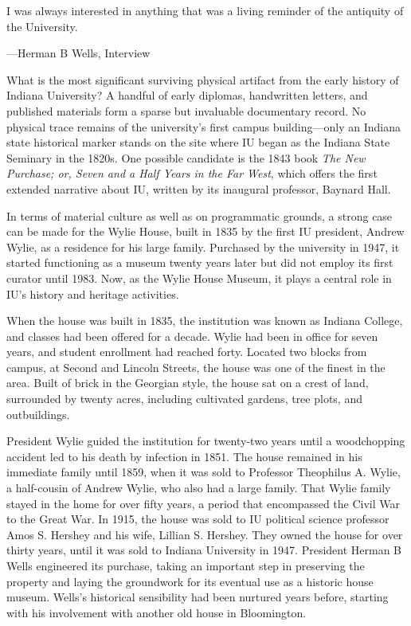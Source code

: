 \documentclass[
  american,
  letterpaper,
]{scrreprt}
\begin{document}
\epigraph{
I was always interested in anything that was a living reminder of the antiquity of the University.  
}
{---Herman B Wells, Interview}

What is the most significant surviving physical artifact from the early
history of Indiana University? A handful of early diplomas, handwritten
letters, and published materials form a sparse but invaluable
documentary record. No physical trace remains of the university's first
campus building---only an Indiana state historical marker stands on the
site where IU began as the Indiana State Seminary in the 1820s. One
possible candidate is the 1843 book \emph{The New Purchase; or, Seven
and a Half Years in the Far West}, which offers the first extended
narrative about IU, written by its inaugural professor, Baynard Hall.

In terms of material culture as well as on programmatic grounds, a
strong case can be made for the Wylie House, built in 1835 by the first
IU president, Andrew Wylie, as a residence for his large family.
Purchased by the university in 1947, it started functioning as a museum
twenty years later but did not employ its first curator until 1983. Now,
as the Wylie House Museum, it plays a central role in IU's history and
heritage activities.

When the house was built in 1835, the institution was known as Indiana
College, and classes had been offered for a decade. Wylie had been in
office for seven years, and student enrollment had reached forty.
Located two blocks from campus, at Second and Lincoln Streets, the house
was one of the finest in the area. Built of brick in the Georgian style,
the house sat on a crest of land, surrounded by twenty acres, including
cultivated gardens, tree plots, and outbuildings.

President Wylie guided the institution for twenty-two years until a
woodchopping accident led to his death by infection in 1851. The house
remained in his immediate family until 1859, when it was sold to
Professor Theophilus A. Wylie, a half-cousin of Andrew Wylie, who also
had a large family. That Wylie family stayed in the home for over fifty
years, a period that encompassed the Civil War to the Great War. In
1915, the house was sold to IU political science professor Amos S.
Hershey and his wife, Lillian S. Hershey. They owned the house for over
thirty years, until it was sold to Indiana University in 1947. President
Herman B Wells engineered its purchase, taking an important step in
preserving the property and laying the groundwork for its eventual use
as a historic house museum. Wells's historical sensibility had been
nurtured years before, starting with his involvement with another old
house in Bloomington.
\end{document}
